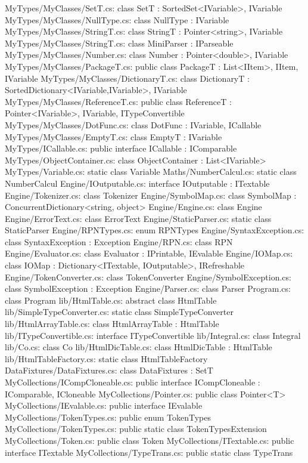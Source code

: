 MyTypes/MyClasses/SetT.cs:	class SetT : SortedSet<IVariable>, IVariable 
MyTypes/MyClasses/NullType.cs:	class NullType : IVariable 
MyTypes/MyClasses/StringT.cs:	class StringT : Pointer<string>, IVariable 
MyTypes/MyClasses/StringT.cs:		class MiniParser : IParseable 
MyTypes/MyClasses/Number.cs:	class Number : Pointer<double>, IVariable 
MyTypes/MyClasses/PackageT.cs:	public class PackageT : List<IItem>, IItem, IVariable 
MyTypes/MyClasses/DictionaryT.cs:	class DictionaryT : SortedDictionary<IVariable,IVariable>, IVariable 
MyTypes/MyClasses/ReferenceT.cs:	public class ReferenceT : Pointer<IVariable>, IVariable, ITypeConvertible 
MyTypes/MyClasses/DotFunc.cs:	class DotFunc : IVariable, ICallable  
MyTypes/MyClasses/EmptyT.cs:	class EmptyT : IVariable 
MyTypes/ICallable.cs:	public interface ICallable : IComparable 
MyTypes/ObjectContainer.cs:	class ObjectContainer : List<IVariable> 
MyTypes/Variable.cs:	static class Variable 
Maths/NumberCalcul.cs:	static class NumberCalcul 
Engine/IOutputable.cs:	interface IOutputable : ITextable 
Engine/Tokenizer.cs:	class Tokenizer 
Engine/SymbolMap.cs:	class SymbolMap : ConcurrentDictionary<string, object> 
Engine/Engine.cs:	class Engine 
Engine/ErrorText.cs:	class ErrorText 
Engine/StaticParser.cs:	static class StaticParser 
Engine/RPNTypes.cs:	enum RPNTypes 
Engine/SyntaxException.cs:	class SyntaxException : Exception 
Engine/RPN.cs:	class RPN 
Engine/Evaluator.cs:	class Evaluator : IPrintable, IEvalable 
Engine/IOMap.cs:	class IOMap : Dictionary<ITextable, IOutputable>, IRefreshable 
Engine/TokenConverter.cs:	class TokenConverter 
Engine/SymbolException.cs:	class SymbolException : Exception 
Engine/Parser.cs:	class Parser 
Program.cs:	class Program 
lib/HtmlTable.cs:	abstract class HtmlTable 
lib/SimpleTypeConverter.cs:	static class SimpleTypeConverter 
lib/HtmlArrayTable.cs:	class HtmlArrayTable : HtmlTable 
lib/ITypeConvertible.cs:	interface ITypeConvertible 
lib/Integral.cs:	class Integral 
lib/Co.cs:	class Co 
lib/HtmlDicTable.cs:	class HtmlDicTable : HtmlTable 
lib/HtmlTableFactory.cs:	static class HtmlTableFactory 
DataFixtures/DataFixtures.cs:	class DataFixtures : SetT 
MyCollections/ICompCloneable.cs:	public interface ICompCloneable : IComparable, ICloneable 
MyCollections/Pointer.cs:	public class Pointer<T> 
MyCollections/IEvalable.cs:	public interface IEvalable 
MyCollections/TokenTypes.cs:	public enum TokenTypes 
MyCollections/TokenTypes.cs:	public static class TokenTypesExtension 
MyCollections/Token.cs:	public class Token 
MyCollections/ITextable.cs:	public interface ITextable 
MyCollections/TypeTrans.cs:	public static class TypeTrans 
